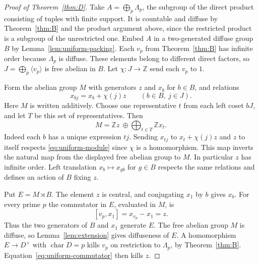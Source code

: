 \documentclass[11pt,a4paper]{article}
\numberwithin{equation}{section}
\newcommand{\Z}{\mathbb Z}
\begin{document}
\begin{proof}[Proof of Theorem~\ref{thm:D}]
Take \(A=\bigoplus_p\Lambda_p\), the subgroup of the direct product consisting of tuples with finite support. It is countable and diffuse by Theorem~\ref{thm:B} and the product argument above, since the restricted product is a subgroup of the unrestricted one. Embed \(A\) in a two-generated diffuse group \(B\) by Lemma~\ref{lem:uniform-packing}. Each \(v_p\) from Theorem~\ref{thm:B} has infinite order because \(\Lambda_p\) is diffuse. These elements belong to different direct factors, so \(J=\bigoplus_p\langle v_p\rangle\) is free abelian in \(B\). Let \(\chi:J\to\Z\) send each \(v_p\) to \(1\).

Form the abelian group \(M\) with generators \(z\) and \(x_b\) for \(b\in B\), and relations
\begin{equation}\label{eq:uniform-module}
 x_{bj}=x_b+\chi(j)z \qquad(b\in B,\ j\in J).
\end{equation}
Here \(M\) is written additively. Choose one representative \(t\) from each left coset \(bJ\), and let \(T\) be this set of representatives. Then
\[
 M=\Z z\ \oplus\!\bigoplus_{t\in T}\Z x_t .
\]
Indeed each \(b\) has a unique expression \(tj\). Sending \(x_{tj}\) to \(x_t+\chi(j)z\) and \(z\) to itself respects \eqref{eq:uniform-module} since \(\chi\) is a homomorphism. This map inverts the natural map from the displayed free abelian group to \(M\). In particular \(z\) has infinite order. Left translation \(x_b\mapsto x_{gb}\) for \(g\in B\) respects the same relations and defines an action of \(B\) fixing \(z\).

Put \(E=M\rtimes B\). The element \(z\) is central, and conjugating \(x_1\) by \(b\) gives \(x_b\). For every prime \(p\) the commutator in \(E\), evaluated in \(M\), is
\begin{equation}\label{eq:uniform-commutator}
 [v_p,x_1]=x_{v_p}-x_1=z .
\end{equation}
Thus the two generators of \(B\) and \(x_1\) generate \(E\). The free abelian group \(M\) is diffuse, so Lemma~\ref{lem:extension} gives diffuseness of \(E\). A homomorphism \(E\to D^\times\) with \(\operatorname{char}D=p\) kills \(v_p\) on restriction to \(\Lambda_p\), by Theorem~\ref{thm:B}. Equation~\eqref{eq:uniform-commutator} then kills \(z\).


\end{proof}
\end{document}

